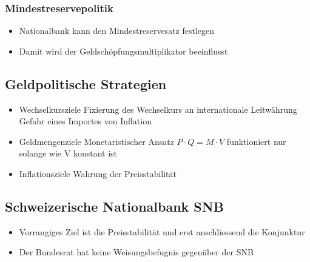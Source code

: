 \subsubsection{Mindestreservepolitik}
\begin{itemize}
	\item Nationalbank kann den Mindestreservesatz festlegen
	\item Damit wird der Geldschöpfungsmultiplikator beeinflusst
\end{itemize}
\subsection{Geldpolitische Strategien}
\begin{itemize}
	\item Wechselkursziele
	\subitem Fixierung des Wechselkurs an internationale Leitwährung
	\subitem Gefahr eines Importes von Inflation
	\item Geldmengenziele
	\subitem Monetaristischer Ansatz $P \cdot Q = M \cdot V$
	\subitem funktioniert nur solange wie V konstant ist
	\item Inflationsziele
	\subitem Wahrung der Preisstabilität
\end{itemize}
\subsection{Schweizerische Nationalbank SNB}
\begin{itemize}
	\item Vorrangiges Ziel ist die Preisstabilität und erst anschliessend die Konjunktur
	\item Der Bundesrat hat keine Weisungsbefugnis gegenüber der SNB
\end{itemize}
\vspace{1cm}